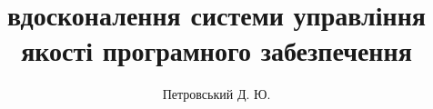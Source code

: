 \documentclass{bdrvntu}
\title{вдосконалення системи управління якості програмного забезпечення}
\author{Петровський Д. Ю.}
\begin{document}
\maketitlebdr

\tableofcontents

\end{document}
